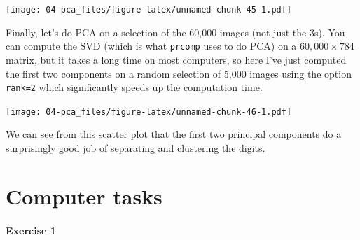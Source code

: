 \documentclass[]{book}
\newenvironment{Shaded}{\begin{snugshade}}{\end{snugshade}}
\newcommand{\CommentTok}[1]{\textcolor[rgb]{0.56,0.35,0.01}{\textit{#1}}}
\newcommand{\DataTypeTok}[1]{\textcolor[rgb]{0.13,0.29,0.53}{#1}}
\newcommand{\DecValTok}[1]{\textcolor[rgb]{0.00,0.00,0.81}{#1}}
\newcommand{\KeywordTok}[1]{\textcolor[rgb]{0.13,0.29,0.53}{\textbf{#1}}}
\newcommand{\NormalTok}[1]{#1}
\newcommand{\OperatorTok}[1]{\textcolor[rgb]{0.81,0.36,0.00}{\textbf{#1}}}
\newcommand{\StringTok}[1]{\textcolor[rgb]{0.31,0.60,0.02}{#1}}
\let\oldparagraph\paragraph
\renewcommand{\paragraph}[1]{\oldparagraph{#1}\mbox{}}
\theoremstyle{definition}
\theoremstyle{definition}
\theoremstyle{definition}
\theoremstyle{remark}
\begin{document}
\texttt{[image: 04-pca\_files/figure-latex/unnamed-chunk-45-1.pdf]}

Finally, let's do PCA on a selection of the 60,000 images (not just the 3s). You can compute the SVD (which is what \texttt{prcomp} uses to do PCA) on a \(60,000 \times 784\) matrix, but it takes a long time on most computers, so here I've just computed the first two components on a random selection of 5,000 images using the option \texttt{rank=2} which significantly speeds up the computation time.

\begin{Shaded}
\end{Shaded}

\texttt{[image: 04-pca\_files/figure-latex/unnamed-chunk-46-1.pdf]}

We can see from this scatter plot that the first two principal components do a surprisingly good job of separating and clustering the digits.

\hypertarget{pca-comptask}{%
\section{Computer tasks}\label{pca-comptask}}

\hypertarget{exercise-1}{%
\paragraph{Exercise 1}\label{exercise-1}}
\end{document}
